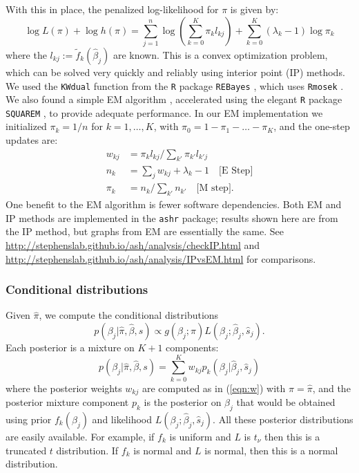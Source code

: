 \documentclass[11pt]{article}
\def\bhat{\hat{\beta}}
\def\shat{\hat{s}}
\begin{document}
With this in place, the penalized log-likelihood for $\pi$ is given by:
\begin{equation}
\log L(\pi) + \log h(\pi) = \sum_{j=1}^n \log(\sum_{k=0}^K \pi_k l_{kj}) + \sum_{k=0}^K (\lambda_k-1) \log \pi_k
\end{equation}
where the $l_{kj}:= \tilde{f}_k(\bhat_j)$ are known. This is a convex optimization problem, which
can be solved very quickly and reliably using interior point (IP) methods. We used the {\tt KWdual} function from the {\tt R} package {\tt REBayes} \cite{REBayes}, which uses {\tt Rmosek} \cite{Rmosek}. We also found a simple EM algorithm \cite{dempster77}, accelerated using the elegant {\tt R} package {\tt SQUAREM} \cite{varadhan2008simple},
to provide adequate performance. In our EM implementation we initialized $\pi_k=1/n$ for $k=1,\dots,K$, with $\pi_0=1-\pi_1-\dots-\pi_K$,
and the one-step updates are:
\begin{align} \label{eqn:w}
w_{kj} & = \pi_k l_{kj} / \sum_{k'} {\pi_{k'} l_{k'j}} \\
n_k & = \sum_j w_{kj} + \lambda_k - 1 \quad \text{[E Step]} \\
\pi_k &= n_k/\sum_{k'} n_{k'} \quad \text{[M step]}.
\end{align}
One benefit to the EM algorithm is fewer software dependencies.
Both EM and IP methods are implemented in the {\tt ashr} package; results shown here are from the IP method, but graphs from EM are essentially the same.
See \href{http://stephenslab.github.io/ash/analysis/checkIP.html}{http://stephenslab.github.io/ash/analysis/checkIP.html}  and \href{http://stephenslab.github.io/ash/analysis/IPvsEM.html}{http://stephenslab.github.io/ash/analysis/IPvsEM.html}  for comparisons.

\subsubsection*{Conditional distributions}

Given $\hat\pi$, we compute the conditional distributions 
\begin{equation}
p(\beta_j | \hat\pi, \bhat, s) \propto g(\beta_j; \pi) L(\beta_j; \bhat_j, \shat_j).
\end{equation} 
Each posterior is a mixture on $K+1$ components:
\begin{equation}
p(\beta_j | \hat\pi, \bhat, s) = \sum_{k=0}^K w_{kj} p_k(\beta_j | \bhat_j, \shat_j)
\end{equation}
where the posterior weights $w_{kj}$ are computed as in (\ref{eqn:w}) with $\pi=\hat\pi$,
and the posterior mixture component $p_k$ is the posterior on $\beta_j$ that would be obtained using prior 
$f_k(\beta_j)$ and likelihood $L(\beta_j; \bhat_j,\shat_j)$.
All these posterior distributions are easily available.
For example, if $f_k$ is uniform and $L$ is $t_\nu$ then this is a truncated $t$ distribution.
If $f_k$ is normal and $L$ is normal, then this is a normal distribution.
\end{document}
